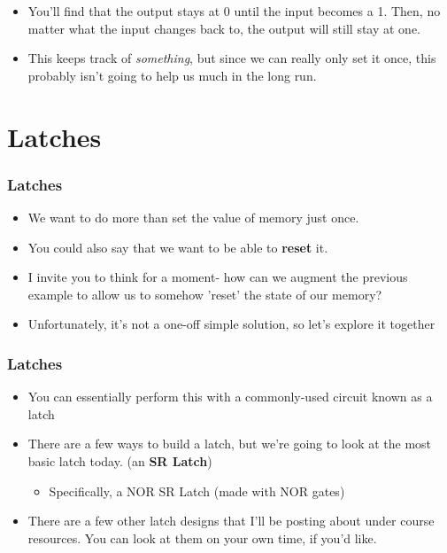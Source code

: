 \documentclass{beamer}
\begin{document}
\begin{frame}
{\begin{tikzpicture}[x=0.75pt,y=0.75pt,yscale=-1,xscale=1]
\end{tikzpicture}

			
			}   			
   			
   			\begin{itemize}
   				\item You'll find that the output stays at 0 until the input becomes a 1. Then, no matter what the input changes back to, the output will still stay at one.
   				\item This keeps track of \textit{something}, but since we can really only set it once, this probably isn't going to help us much in the long run.
   			\end{itemize}
   		\end{frame}
   		
   	
   	\section{Latches}
   	
   		\begin{frame}
   			\frametitle{Latches}
   			\begin{itemize}
   				\item We want to do more than set the value of memory just once.
   				\item You could also say that we want to be able to \textbf{reset} it.
   				\item I invite you to think for a moment- how can we augment the previous example to allow us to somehow 'reset' the state of our memory?
   				\item Unfortunately, it's not a one-off simple solution, so let's explore it together
   				
   			\end{itemize}
   		\end{frame}
   		
   		\begin{frame}
   			\frametitle{Latches}
   			\begin{itemize}
   				\item You can essentially perform this with a commonly-used circuit known as a latch
   				\item There are a few ways to build a latch, but we're going to look at the most basic latch today. (an \textbf{SR Latch})
   				\begin{itemize}
   					\item Specifically, a NOR SR Latch (made with NOR gates)
   				\end{itemize}
   				\item There are a few other latch designs that I'll be posting about under course resources. You can look at them on your own time, if you'd like.
   			\end{itemize}
   		\end{frame}
   		
\end{document}
